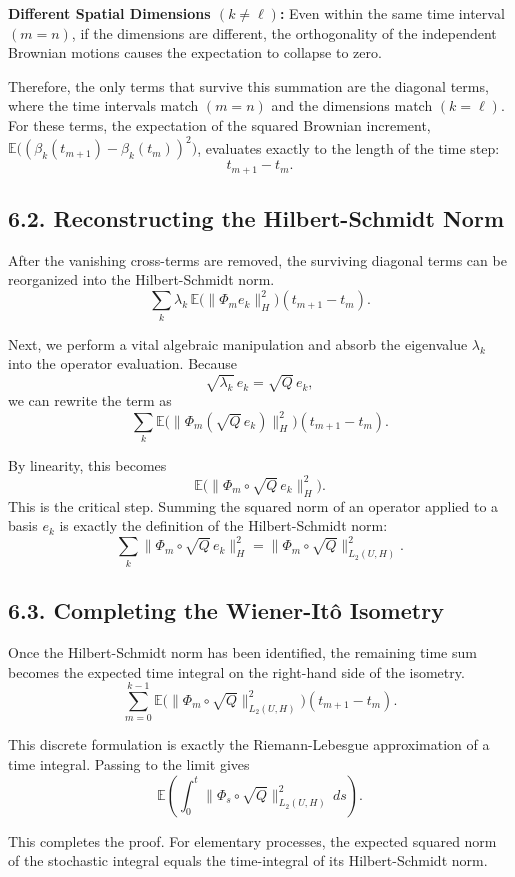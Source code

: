 \documentclass[11pt]{article}
\theoremstyle{definition}
\theoremstyle{remark}
\begin{document}
\textbf{Different Spatial Dimensions \((k\neq \ell)\):} Even within the same time interval \((m=n)\), if the dimensions are different, the orthogonality of the independent Brownian motions causes the expectation to collapse to zero.

Therefore, the only terms that survive this summation are the diagonal terms, where the time intervals match \((m=n)\) and the dimensions match \((k=\ell)\). For these terms, the expectation of the squared Brownian increment,
 \(\mathbb E\bigl((\beta_k(t_{m+1})-\beta_k(t_m))^2\bigr)\), evaluates exactly to the length of the time step:
\[
t_{m+1}-t_m.
\]

\subsection*{6.2. Reconstructing the Hilbert-Schmidt Norm}
After the vanishing cross-terms are removed, the surviving diagonal terms can be reorganized into the Hilbert-Schmidt norm.
\[
\sum_k \lambda_k \,\mathbb E\bigl(\|\Phi_m e_k\|_H^2\bigr)(t_{m+1}-t_m).
\]

Next, we perform a vital algebraic manipulation and absorb the eigenvalue \(\lambda_k\) into the operator evaluation. Because
\[
\sqrt{\lambda_k}\,e_k=\sqrt{Q}\,e_k,
\]
we can rewrite the term as
\[
\sum_k \mathbb E\bigl(\|\Phi_m(\sqrt{Q}\,e_k)\|_H^2\bigr)(t_{m+1}-t_m).
\]

By linearity, this becomes
\[
\mathbb E\bigl(\|\Phi_m\circ \sqrt{Q}\, e_k\|_H^2\bigr).
\]
This is the critical step. Summing the squared norm of an operator applied to a basis \(e_k\) is exactly the definition of the Hilbert-Schmidt norm:
\[
\sum_k \|\Phi_m\circ \sqrt{Q}\,e_k\|_H^2
=
\|\Phi_m\circ \sqrt{Q}\|_{L_2(U,H)}^2.
\]

\subsection*{6.3. Completing the Wiener-It\^o Isometry}
Once the Hilbert-Schmidt norm has been identified, the remaining time sum becomes the expected time integral on the right-hand side of the isometry.
\[
\sum_{m=0}^{k-1}\mathbb E\bigl(\|\Phi_m\circ \sqrt{Q}\|_{L_2(U,H)}^2\bigr)(t_{m+1}-t_m).
\]

This discrete formulation is exactly the Riemann-Lebesgue approximation of a time integral. Passing to the limit gives
\[
\mathbb E\left(\int_0^t \|\Phi_s\circ \sqrt{Q}\|_{L_2(U,H)}^2\,ds\right).
\]

This completes the proof. For elementary processes, the expected squared norm of the stochastic integral equals the time-integral of its Hilbert-Schmidt norm.
\end{document}
